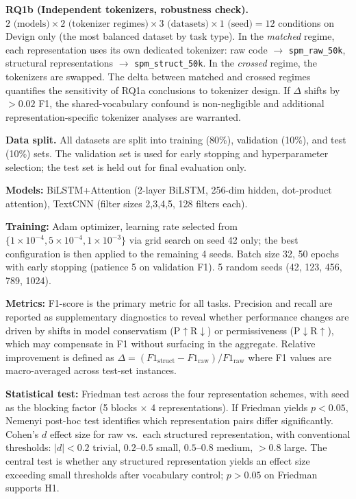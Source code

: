 \documentclass[pdflatex,sn-mathphys,Numbered]{sn-jnl}
\begin{document}
\textbf{RQ1b (Independent tokenizers, robustness check).} $2 \text{ (models)} \times 2 \text{ (tokenizer regimes)} \times 3 \text{ (datasets)} \times 1 \text{ (seed)} = 12$ conditions on Devign only (the most balanced dataset by task type). In the \emph{matched} regime, each representation uses its own dedicated tokenizer: raw code $\to$ \texttt{spm\_raw\_50k}, structural representations $\to$ \texttt{spm\_struct\_50k}. In the \emph{crossed} regime, the tokenizers are swapped. The delta between matched and crossed regimes quantifies the sensitivity of RQ1a conclusions to tokenizer design. If $\Delta$ shifts by $>0.02$ F1, the shared-vocabulary confound is non-negligible and additional representation-specific tokenizer analyses are warranted.

\textbf{Data split.} All datasets are split into training (80\%), validation (10\%), and test (10\%) sets. The validation set is used for early stopping and hyperparameter selection; the test set is held out for final evaluation only.

\textbf{Models:} BiLSTM+Attention (2-layer BiLSTM, 256-dim hidden, dot-product attention), TextCNN (filter sizes 2,3,4,5, 128 filters each).

\textbf{Training:} Adam optimizer, learning rate selected from $\{1\times 10^{-4}, 5\times 10^{-4}, 1\times 10^{-3}\}$ via grid search on seed 42 only; the best configuration is then applied to the remaining 4 seeds. Batch size 32, 50 epochs with early stopping (patience 5 on validation F1). 5 random seeds (42, 123, 456, 789, 1024).

\textbf{Metrics:} F1-score is the primary metric for all tasks. Precision and recall are reported as supplementary diagnostics to reveal whether performance changes are driven by shifts in model conservatism (P$\uparrow$R$\downarrow$) or permissiveness (P$\downarrow$R$\uparrow$), which may compensate in F1 without surfacing in the aggregate. Relative improvement is defined as $\Delta = (F1_{\text{struct}} - F1_{\text{raw}}) / F1_{\text{raw}}$ where F1 values are macro-averaged across test-set instances.

\textbf{Statistical test:} Friedman test across the four representation schemes, with seed as the blocking factor (5 blocks $\times$ 4 representations). If Friedman yields $p < 0.05$, Nemenyi post-hoc test identifies which representation pairs differ significantly. Cohen's $d$ effect size for raw vs.\ each structured representation, with conventional thresholds: $|d| < 0.2$ trivial, $0.2$--$0.5$ small, $0.5$--$0.8$ medium, $>0.8$ large. The central test is whether any structured representation yields an effect size exceeding small thresholds after vocabulary control; $p > 0.05$ on Friedman supports H1.
\end{document}
